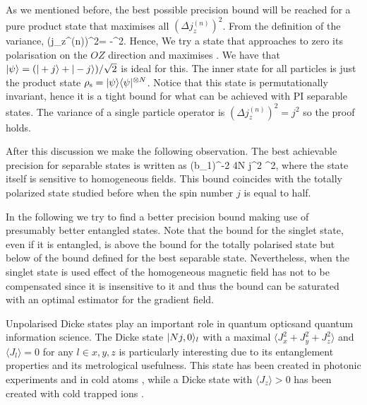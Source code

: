 As we mentioned before, the best possible precision bound will be reached for a pure product state that maximises all $(\Delta j_z^{(n)})^2$.
From the definition of the variance,
\be
(\Delta j_z^{(n)})^2=
-^2.
\ee
Hence, We try a state that approaches to zero its polarisation on the $OZ$ direction and maximises .
We have that  $\vert \psi \rangle=(\vert +j \rangle+\vert -j \rangle)/\sqrt{2}$ is ideal for this.
The inner state for all particles is just the product state $\rho_{\rm s} =\vert \psi \rangle\langle \psi \vert^{\otimes N}$.
Notice that this state is permutationally invariant, hence it is a tight bound for what can be achieved with PI separable states.
The variance of a single particle operator is $(\Delta j_z^{(n)})^2=j^2$ so the proof holds.

After this discussion we make the following observation. The best achievable precision for separable states is written as
\be
(\Delta b_1)^{-2} \leq 4N j^2 \sigma^2,
\label{eq:best_separable}
\ee
where the state itself is sensitive to homogeneous fields.
This bound coincides with the totally polarized state studied before when the spin number $j$ is equal to half.
\label{obs:precision bound for separable states}

In the following we try to find a better precision bound making use of presumably better entangled states.
Note that the bound for the singlet state, even if it is entangled, is above the bound for the totally polarised state but below of the bound defined for the best separable state.
Nevertheless, when the singlet state is used effect of the homogeneous magnetic field has not to be compensated since it is insensitive to it and thus the bound can be saturated with an optimal estimator for the gradient field.


Unpolarised Dicke states play an important role in quantum opticsand quantum information science.
The Dicke state $\vert Nj,0 \rangle_l$ with a maximal $\langle J_x^2+J_y^2+J_z^2 \rangle$ and $\langle J_l\rangle=0$ for any $l\in x,y,z$ is particularly interesting due to its entanglement properties and its metrological usefulness.
This state has been created in photonic experiments \cite{Kiesel2007,Wieczorek2009,Chiuri2012} and in cold atoms \cite{Lucke2011,Hamley2012}, while a Dicke state with $\langle J_z\rangle>0$ has been created with cold trapped ions \cite{Haffner2005}.

